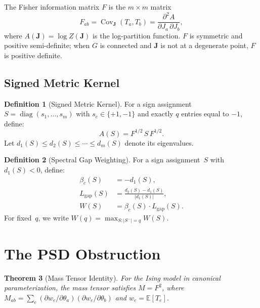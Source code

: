 \documentclass[11pt]{article}
\newtheorem{theorem}{Theorem}[section]
\theoremstyle{definition}
\newtheorem{definition}[theorem]{Definition}
\theoremstyle{remark}
\begin{document}
The Fisher information matrix $F$ is the $m \times m$ matrix
\begin{equation}
  F_{ab} = \operatorname{Cov}_{\mathbf{J}}(T_a, T_b)
  = \frac{\partial^2 A}{\partial J_a \, \partial J_b},
  \label{eq:fisher}
\end{equation}
where $A(\mathbf{J}) = \log Z(\mathbf{J})$ is the log-partition function.
$F$ is symmetric and positive semi-definite; when $G$ is connected and
$\mathbf{J}$ is not at a degenerate point, $F$ is positive definite.

\subsection{Signed Metric Kernel}

\begin{definition}[Signed Metric Kernel]
\label{def:signed-kernel}
For a sign assignment $S = \operatorname{diag}(s_1, \ldots, s_m)$ with
$s_e \in \{+1, -1\}$ and exactly $q$ entries equal to $-1$, define:
\begin{equation}
  A(S) = F^{1/2} \, S \, F^{1/2}.
  \label{eq:signed-kernel}
\end{equation}
Let $d_1(S) \leq d_2(S) \leq \cdots \leq d_m(S)$ denote its eigenvalues.
\end{definition}

\begin{definition}[Spectral Gap Weighting]
\label{def:spectral-gap}
For a sign assignment~$S$ with $d_1(S) < 0$, define:
\begin{align}
  \beta_c(S) &= -d_1(S), \label{eq:beta-c} \\
  L_{\mathrm{gap}}(S) &= \frac{d_2(S) - d_1(S)}{|d_1(S)|}, \label{eq:lgap} \\
  W(S) &= \beta_c(S) \cdot L_{\mathrm{gap}}(S). \label{eq:W}
\end{align}
For fixed~$q$, we write $W(q) = \max_{S : |S^{-}| = q} W(S)$.
\end{definition}


\section{The PSD Obstruction}
\label{sec:psd}

\begin{theorem}[Mass Tensor Identity]
\label{thm:MF2}
For the Ising model in canonical parameterization, the mass tensor satisfies
$M = F^2$, where $M_{ab} = \sum_e (\partial w_e / \partial \theta_a)
(\partial w_e / \partial \theta_b)$ and $w_e = \mathbb{E}[T_e]$.
\end{theorem}
\end{document}
